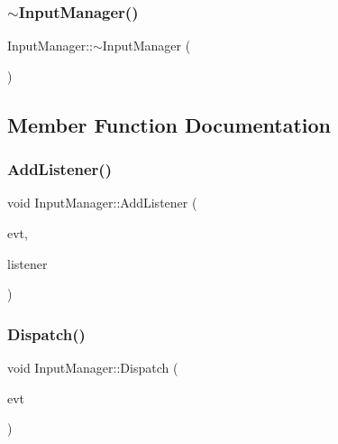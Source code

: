 \subsubsection{\texorpdfstring{$\sim$\+Input\+Manager()}{~InputManager()}}
{\footnotesize\ttfamily Input\+Manager\+::$\sim$\+Input\+Manager (\begin{DoxyParamCaption}{ }\end{DoxyParamCaption})}



\subsection{Member Function Documentation}
\hypertarget{class_input_manager_a1f055ac31c702b3c4d183d9294b9aa6b}{}\label{class_input_manager_a1f055ac31c702b3c4d183d9294b9aa6b} 
\subsubsection{\texorpdfstring{Add\+Listener()}{AddListener()}}
{\footnotesize\ttfamily void Input\+Manager\+::\+Add\+Listener (\begin{DoxyParamCaption}\item[{int}]{evt,  }\item[{\hyperlink{class_event_listener}{Event\+Listener} $\ast$}]{listener }\end{DoxyParamCaption})}

\hypertarget{class_input_manager_a64666af03343a9065b8a0c7905aecd02}{}\label{class_input_manager_a64666af03343a9065b8a0c7905aecd02} 
\subsubsection{\texorpdfstring{Dispatch()}{Dispatch()}\hspace{0.1cm}{\footnotesize\ttfamily [1/3]}}
{\footnotesize\ttfamily void Input\+Manager\+::\+Dispatch (\begin{DoxyParamCaption}\item[{\hyperlink{class_event_listener_ae72c5cb67f8dc880170bf2137837f6ce}{Event\+Listener\+::\+Key\+Down\+Event}}]{evt }\end{DoxyParamCaption})}

\hypertarget{class_input_manager_a9df2113b8d6c81099cebcbc80423a72e}{}\label{class_input_manager_a9df2113b8d6c81099cebcbc80423a72e} 
